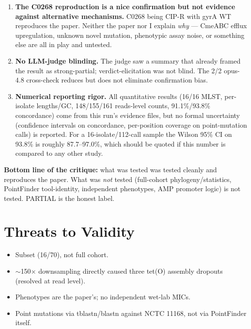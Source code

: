 \documentclass[11pt,a4paper]{article}
\begin{document}
\begin{enumerate}[leftmargin=1.4em,itemsep=0.35em]
  \item \textbf{The C0268 reproduction is a nice confirmation but not evidence against alternative mechanisms.} C0268 being CIP-R with gyrA WT reproduces the paper. Neither the paper nor I explain \emph{why} --- CmeABC efflux upregulation, unknown novel mutation, phenotypic assay noise, or something else are all in play and untested.
  \item \textbf{No LLM-judge blinding.} The judge saw a summary that already framed the result as strong-partial; verdict-elicitation was not blind. The 2/2 opus-4.8 cross-check reduces but does not eliminate confirmation bias.
  \item \textbf{Numerical reporting rigor.} All quantitative results (16/16 MLST, per-isolate lengths/GC, 148/155/161 reads-level counts, 91.1\%/93.8\% concordance) come from this run's evidence files, but no formal uncertainty (confidence intervals on concordance, per-position coverage on point-mutation calls) is reported. For a 16-isolate/112-call sample the Wilson 95\% CI on 93.8\% is roughly 87.7--97.0\%, which should be quoted if this number is compared to any other study.
\end{enumerate}

\noindent\textbf{Bottom line of the critique:} what was tested was tested cleanly and reproduces the paper. What was \emph{not} tested (full-cohort phylogeny/statistics, PointFinder tool-identity, independent phenotypes, AMP promoter logic) is not tested. PARTIAL is the honest label.

\section{Threats to Validity}
\begin{itemize}[leftmargin=1.4em,itemsep=0.2em]
  \item Subset (16/70), not full cohort.
  \item $\sim$150$\times$ downsampling directly caused three tet(O) assembly dropouts (resolved at read level).
  \item Phenotypes are the paper's; no independent wet-lab MICs.
  \item Point mutations via tblastn/blastn against NCTC 11168, not via PointFinder itself.
\end{itemize}
\end{document}
